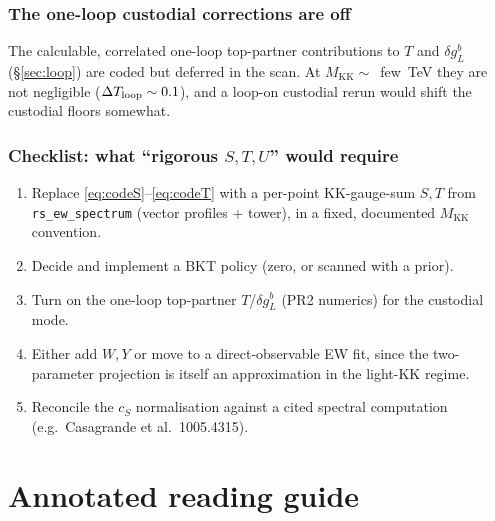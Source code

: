 \documentclass[11pt]{article}
\newcommand{\MKK}{M_{\mathrm{KK}}}
\newcommand{\code}[1]{\texttt{#1}}
\theoremstyle{definition}
\begin{document}
\section{The one-loop custodial corrections are off}
The calculable, correlated one-loop top-partner contributions to $T$ and
$\delta g_L^b$ (\S\ref{sec:loop}) are coded but deferred in the scan. At
$\MKK\sim$~few~TeV they are not negligible ($\Delta T_{\rm loop}\sim 0.1$), and a
loop-on custodial rerun would shift the custodial floors somewhat.

\section{Checklist: what ``rigorous $S,T,U$'' would require}
\begin{enumerate}[leftmargin=1.8em]
\item Replace \eqref{eq:codeS}--\eqref{eq:codeT} with a per-point KK-gauge-sum
$S,T$ from \code{rs\_ew\_spectrum} (vector profiles + tower), in a fixed,
documented $\MKK$ convention.
\item Decide and implement a BKT policy (zero, or scanned with a prior).
\item Turn on the one-loop top-partner $T$/$\delta g_L^b$ (PR2 numerics) for the
custodial mode.
\item Either add $W,Y$ or move to a direct-observable EW fit, since the
two-parameter projection is itself an approximation in the light-KK regime.
\item Reconcile the $c_S$ normalisation against a cited spectral computation
(e.g.\ Casagrande et al.\ 1005.4315).
\end{enumerate}

\part*{Annotated reading guide}
\end{document}
